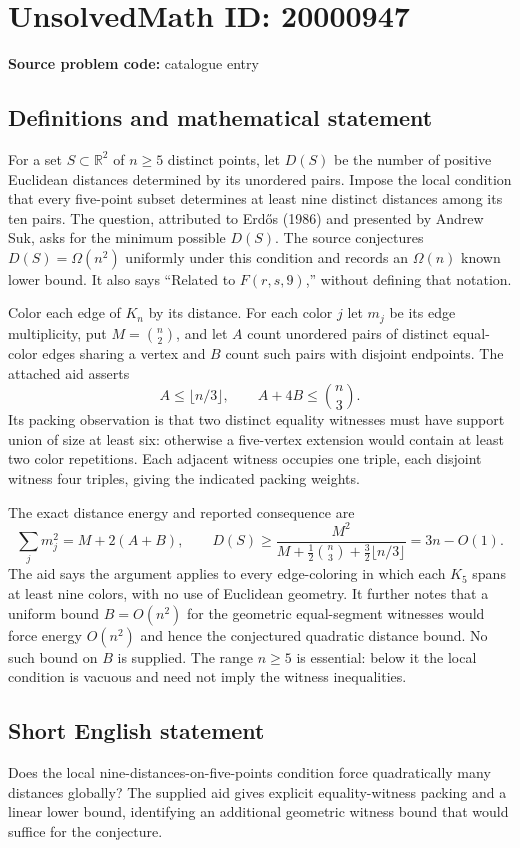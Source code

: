 \documentclass[11pt]{article}
\newcommand{\R}{\mathbb{R}}
\begin{document}
\section*{UnsolvedMath ID: 20000947}
\textbf{Source problem code:} catalogue entry
\subsection{Definitions and mathematical statement}
For a set $S\subset\R^2$ of $n\ge5$ distinct points, let $D(S)$ be the number of positive Euclidean distances determined by its unordered pairs. Impose the local condition that every five-point subset determines at least nine distinct distances among its ten pairs. The question, attributed to Erd\H{o}s (1986) and presented by Andrew Suk, asks for the minimum possible $D(S)$. The source conjectures $D(S)=\Omega(n^2)$ uniformly under this condition and records an $\Omega(n)$ known lower bound. It also says ``Related to $F(r,s,9)$,'' without defining that notation.

Color each edge of $K_n$ by its distance. For each color $j$ let $m_j$ be its edge multiplicity, put $M=\binom n2$, and let $A$ count unordered pairs of distinct equal-color edges sharing a vertex and $B$ count such pairs with disjoint endpoints. The attached aid asserts
\[
A\le\lfloor n/3\rfloor,\qquad A+4B\le\binom n3.
\]
Its packing observation is that two distinct equality witnesses must have support union of size at least six: otherwise a five-vertex extension would contain at least two color repetitions. Each adjacent witness occupies one triple, each disjoint witness four triples, giving the indicated packing weights.

The exact distance energy and reported consequence are
\[
\sum_jm_j^2=M+2(A+B),\qquad
D(S)\ge\frac{M^2}{M+\frac12\binom n3+\frac32\lfloor n/3\rfloor}=3n-O(1).
\]
The aid says the argument applies to every edge-coloring in which each $K_5$ spans at least nine colors, with no use of Euclidean geometry. It further notes that a uniform bound $B=O(n^2)$ for the geometric equal-segment witnesses would force energy $O(n^2)$ and hence the conjectured quadratic distance bound. No such bound on $B$ is supplied. The range $n\ge5$ is essential: below it the local condition is vacuous and need not imply the witness inequalities.
\subsection{Short English statement}
Does the local nine-distances-on-five-points condition force quadratically many distances globally? The supplied aid gives explicit equality-witness packing and a linear lower bound, identifying an additional geometric witness bound that would suffice for the conjecture.
\end{document}

